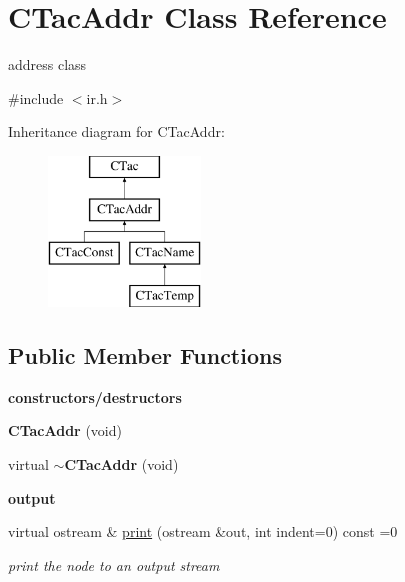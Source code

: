 \hypertarget{classCTacAddr}{\section{C\-Tac\-Addr Class Reference}
\label{classCTacAddr}
}


address class  




{\ttfamily \#include $<$ir.\-h$>$}

Inheritance diagram for C\-Tac\-Addr\-:\begin{figure}[H]
\begin{center}
\leavevmode
\includegraphics[height=4.000000cm]{classCTacAddr}
\end{center}
\end{figure}
\subsection*{Public Member Functions}
\begin{Indent}{\bf constructors/destructors}\par
\begin{DoxyCompactItemize}
\item 
\hypertarget{classCTacAddr_a213f8103ba37c7b9c5e4c6bf0b19b5ed}{{\bfseries C\-Tac\-Addr} (void)}\label{classCTacAddr_a213f8103ba37c7b9c5e4c6bf0b19b5ed}

\item 
\hypertarget{classCTacAddr_abe6bc143936cdc2d870169eff6d18b8a}{virtual {\bfseries $\sim$\-C\-Tac\-Addr} (void)}\label{classCTacAddr_abe6bc143936cdc2d870169eff6d18b8a}

\end{DoxyCompactItemize}
\end{Indent}
\begin{Indent}{\bf output}\par
\begin{DoxyCompactItemize}
\item 
virtual ostream \& \hyperlink{classCTacAddr_a5133c77d5721bb174a4e5a5ab26d5a0d}{print} (ostream \&out, int indent=0) const =0
\begin{DoxyCompactList}\small\item\em print the node to an output stream \end{DoxyCompactList}\end{DoxyCompactItemize}
\end{Indent}


